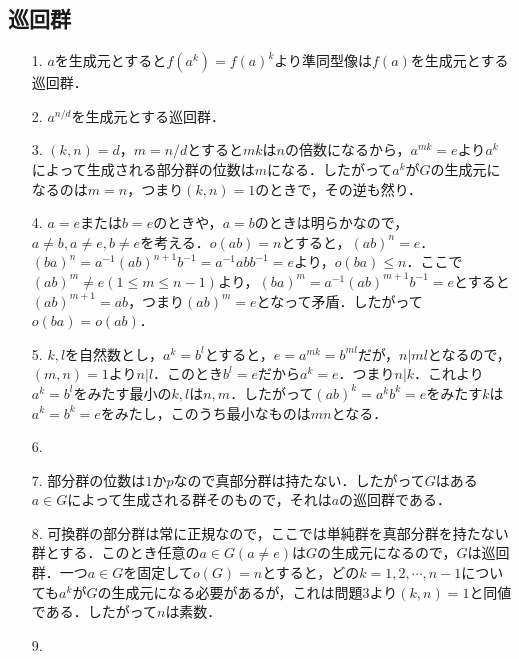 \documentclass[a4paper,10pt,uplatex]{jsarticle}
\numberwithin{equation}{section}
\theoremstyle{mystyle}
\begin{document}
\subsection{巡回群}
\begin{itemize}
    \item[1.] $a$を生成元とすると$f(a^k) = f(a)^k$より準同型像は$f(a)$を生成元とする巡回群．
    \item[2.] $a^{n/d}$を生成元とする巡回群．
    \item[3.] $(k,n)=d$，$m=n/d$とすると$mk$は$n$の倍数になるから，$a^{mk}=e$より$a^k$によって生成される部分群の位数は$m$になる．したがって$a^k$が$G$の生成元になるのは$m=n$，つまり$(k,n)=1$のときで，その逆も然り．
    \item[4.] $a=e$または$b=e$のときや，$a=b$のときは明らかなので，$a \neq b, a \neq e, b \neq e$を考える．$o(ab)=n$とすると，$(ab)^n = e$．$(ba)^n = a^{-1}(ab)^{n+1}b^{-1} = a^{-1}abb^{-1}=e$より，$o(ba) \leq n$．ここで$(ab)^m \neq e(1 \leq m \leq n-1)$より，$(ba)^m = a^{-1}(ab)^{m+1}b^{-1} = e$とすると$(ab)^{m+1} = ab$，つまり$(ab)^m = e$となって矛盾．したがって$o(ba) = o(ab)$．
    \item[5.] $k,l$を自然数とし，$a^k = b^l$とすると，$e = a^{mk} = b^{ml}$だが，$n|ml$となるので，$(m,n)=1$より$n|l$．このとき$b^l=e$だから$a^k=e$．つまり$n|k$．これより$a^k = b^l$をみたす最小の$k,l$は$n,m$．したがって$(ab)^k = a^kb^k = e$をみたす$k$は$a^k=b^k=e$をみたし，このうち最小なものは$mn$となる．
    \item[6.] 
    \item[7.] 部分群の位数は$1$か$p$なので真部分群は持たない．したがって$G$はある$a \in G$によって生成される群そのもので，それは$a$の巡回群である．
    \item[8.] 可換群の部分群は常に正規なので，ここでは単純群を真部分群を持たない群とする．このとき任意の$a \in G(a \neq e)$は$G$の生成元になるので，$G$は巡回群．一つ$a \in G$を固定して$o(G)=n$とすると，どの$k=1,2,\cdots,n-1$についても$a^k$が$G$の生成元になる必要があるが，これは問題3より$(k,n)=1$と同値である．したがって$n$は素数．
    \item[9.] 
\end{itemize}
\end{document}
